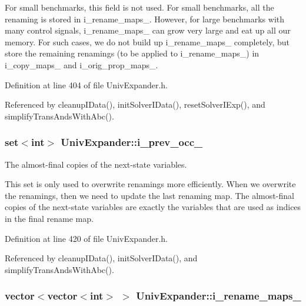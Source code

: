 For small benchmarks, this field is not used. For small benchmarks, all the renaming is stored in i\-\_\-rename\-\_\-maps\-\_\-. However, for large benchmarks with many control signals, i\-\_\-rename\-\_\-maps\-\_\- can grow very large and eat up all our memory. For such cases, we do not build up i\-\_\-rename\-\_\-maps\-\_\- completely, but store the remaining renamings (to be applied to i\-\_\-rename\-\_\-maps\-\_\-) in i\-\_\-copy\-\_\-maps\-\_\- and i\-\_\-orig\-\_\-prop\-\_\-maps\-\_\-. 

Definition at line 404 of file Univ\-Expander.\-h.



Referenced by cleanup\-I\-Data(), init\-Solver\-I\-Data(), reset\-Solver\-I\-Exp(), and simplify\-Trans\-Ands\-With\-Abc().

\hypertarget{classUnivExpander_a02bc6eec7ce33effdac18b8b1c0bd770}{
\subsubsection[{i\-\_\-prev\-\_\-occ\-\_\-}]{\setlength{\rightskip}{0pt plus 5cm}set$<$int$>$ Univ\-Expander\-::i\-\_\-prev\-\_\-occ\-\_\-\hspace{0.3cm}{\ttfamily [protected]}}}\label{classUnivExpander_a02bc6eec7ce33effdac18b8b1c0bd770}


The almost-\/final copies of the next-\/state variables. 

This set is only used to overwrite renamings more efficiently. When we overwrite the renamings, then we need to update the last renaming map. The almost-\/final copies of the next-\/state variables are exactly the variables that are used as indices in the final rename map. 

Definition at line 420 of file Univ\-Expander.\-h.



Referenced by cleanup\-I\-Data(), init\-Solver\-I\-Data(), and simplify\-Trans\-Ands\-With\-Abc().

\hypertarget{classUnivExpander_a8e3bf04d83d2164635bdc57d78617219}{
\subsubsection[{i\-\_\-rename\-\_\-maps\-\_\-}]{\setlength{\rightskip}{0pt plus 5cm}vector$<$vector$<$int$>$ $>$ Univ\-Expander\-::i\-\_\-rename\-\_\-maps\-\_\-\hspace{0.3cm}{\ttfamily [protected]}}}\label{classUnivExpander_a8e3bf04d83d2164635bdc57d78617219}


